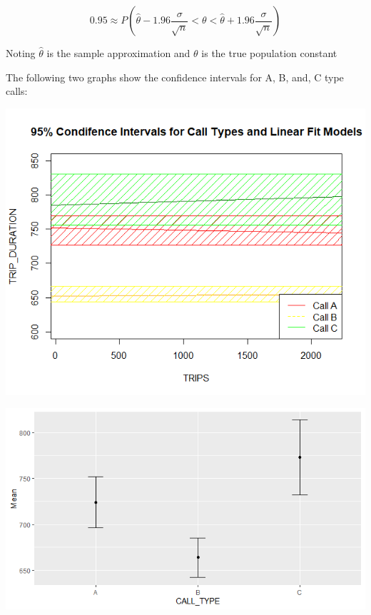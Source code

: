 \documentclass{article}
\numberwithin{equation}{section}
\begin{document}
\begin{equation}
    0.95 \approx P(\hat{\theta}-1.96\frac{\sigma}{\sqrt{n}} < \theta < \hat{\theta}+1.96\frac{\sigma}{\sqrt{n}} )
\end{equation}

Noting $\hat{\theta}$ is the sample approximation and $\theta$ is the true population constant

The following two graphs show the confidence intervals for A, B, and, C type calls:
\begin{center}
\includegraphics[scale=0.5]{95 Percent Confidence Intervals for Call Types and Linear Fit Models.png}    
\end{center}

\begin{center}
\includegraphics[scale=0.5]{MeanCallType_With95ConfidenceInterval.png}\\
\end{center}
\newpage
\end{document}
